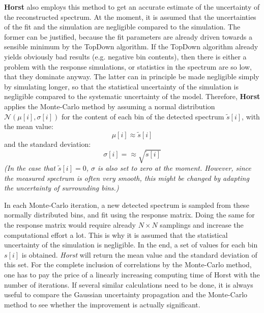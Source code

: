 \documentclass{article}
\begin{document}
\textbf{Horst} also employs this method to get an accurate estimate of the uncertainty of the reconstructed spectrum.
At the moment, it is assumed that the uncertainties of the fit and the simulation are negligible compared to the simulation.
The former can be justified, because the fit parameters are already driven towards a sensible minimum by the TopDown algorithm.
If the TopDown algorithm already yields obviously bad results (e.g. negative bin contents), then there is either a problem with the response simulations, or statistics in the spectrum are so low, that they dominate anyway.
The latter can in principle be made negligible simply by simulating longer, so that the statistical uncertainty of the simulation is negligible compared to the systematic uncertainty of the model.
Therefore, \textbf{Horst} applies the Monte-Carlo method by assuming a normal distribution $\mathcal{N}(\mu [i], \sigma [i])$ for the content of each bin of the detected spectrum $\tilde{s}[i]$, with the mean value:
%
\begin{equation}
	\label{mc_spectrum_mu}
	\mu [i] \approx \tilde{s}[i]
\end{equation}
%
and the standard deviation:
%
\begin{equation}
	\label{mc_spectrum_sigma}
	\sigma[i] = \approx \sqrt{\tilde{s}[i]}
\end{equation}
%
\textit{(In the case that $\tilde {s} [i] = 0$, $\sigma$ is also set to zero at the moment. However, since the measured spectrum is often very smooth, this might be changed by adapting the uncertainty of surrounding bins.)}

In each Monte-Carlo iteration, a new detected spectrum is sampled from these normally distributed bins, and fit using the response matrix.
Doing the same for the response matrix would require already $N \times N$ samplings and increase the computational effort a lot.
This is why it is assumed that the statistical uncertainty of the simulation is negligible.
In the end, a set of values for each bin $s[i]$ is obtained.
\textit{Horst} will return the mean value and the standard deviation of this set.
For the complete inclusion of correlations by the Monte-Carlo method, one has to pay the price of a linearly increasing computing time of \textit{}Horst with the number of iterations.
If several similar calculations need to be done, it is always useful to compare the Gaussian uncertainty propagation and the Monte-Carlo method to see whether the improvement is actually significant.
\end{document}
